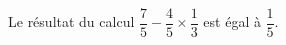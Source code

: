 \begin{exercice*}
    Le résultat du calcul $\dfrac75 - \dfrac45 \times \dfrac13$ est égal à $\dfrac15$.
\end{exercice*}
 

